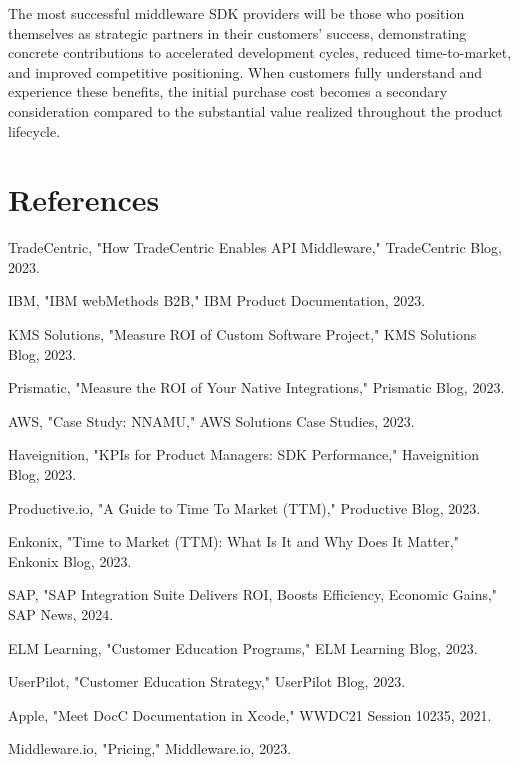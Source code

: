 \documentclass[11pt,a4paper]{article}
\begin{document}
The most successful middleware SDK providers will be those who position themselves as strategic partners in their customers' success, demonstrating concrete contributions to accelerated development cycles, reduced time-to-market, and improved competitive positioning. When customers fully understand and experience these benefits, the initial purchase cost becomes a secondary consideration compared to the substantial value realized throughout the product lifecycle.

\section*{References}

\begin{thebibliography}{99}

 TradeCentric, "How TradeCentric Enables API Middleware," TradeCentric Blog, 2023.

 IBM, "IBM webMethods B2B," IBM Product Documentation, 2023.

 KMS Solutions, "Measure ROI of Custom Software Project," KMS Solutions Blog, 2023.

 Prismatic, "Measure the ROI of Your Native Integrations," Prismatic Blog, 2023.

 AWS, "Case Study: NNAMU," AWS Solutions Case Studies, 2023.

 Haveignition, "KPIs for Product Managers: SDK Performance," Haveignition Blog, 2023.

 Productive.io, "A Guide to Time To Market (TTM)," Productive Blog, 2023.

 Enkonix, "Time to Market (TTM): What Is It and Why Does It Matter," Enkonix Blog, 2023.

 SAP, "SAP Integration Suite Delivers ROI, Boosts Efficiency, Economic Gains," SAP News, 2024.

 ELM Learning, "Customer Education Programs," ELM Learning Blog, 2023.

 UserPilot, "Customer Education Strategy," UserPilot Blog, 2023.

 Apple, "Meet DocC Documentation in Xcode," WWDC21 Session 10235, 2021.

 Middleware.io, "Pricing," Middleware.io, 2023.


\end{thebibliography}
\end{document}
